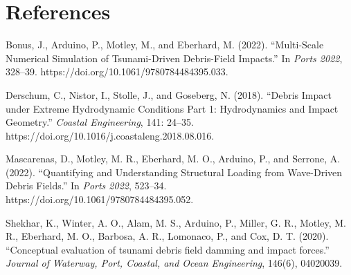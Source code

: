 \documentclass{article}
\begin{document}
\section{References}
Bonus, J., Arduino, P., Motley, M., and Eberhard, M. (2022). ``Multi-Scale Numerical Simulation of Tsunami-Driven Debris-Field Impacts.'' In \textit{Ports 2022}, 328–39. https://doi.org/10.1061/9780784484395.033.

Derschum, C., Nistor, I., Stolle, J., and Goseberg, N. (2018). ``Debris Impact under Extreme Hydrodynamic Conditions Part 1: Hydrodynamics and Impact Geometry.'' \textit{Coastal Engineering}, 141: 24–35. https://doi.org/10.1016/j.coastaleng.2018.08.016.

Mascarenas, D., Motley, M. R., Eberhard, M. O., Arduino, P., and Serrone, A. (2022). ``Quantifying and Understanding Structural Loading from Wave-Driven Debris Fields.'' In \textit{Ports 2022}, 523–34. https://doi.org/10.1061/9780784484395.052.

Shekhar, K., Winter, A. O., Alam, M. S., Arduino, P., Miller, G. R., Motley, M. R., Eberhard, M. O., Barbosa, A. R., Lomonaco, P., and Cox, D. T. (2020). ``Conceptual evaluation of tsunami debris field damming and impact forces.'' \textit{Journal of Waterway, Port, Coastal, and Ocean Engineering}, 146(6), 04020039.
\end{document}
